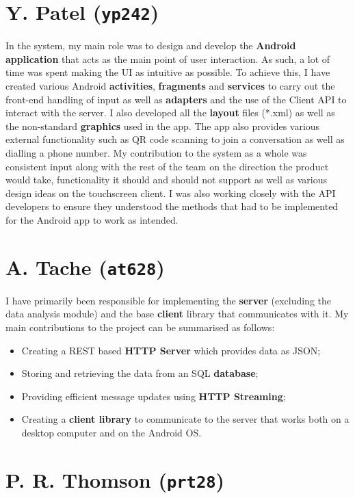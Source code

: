 \documentclass[12p, a4paper, onecolumn]{report}
\begin{document}
\section{Y. Patel (\texttt{yp242})}

In the system, my main role was to design and develop the \textbf{Android application} that acts as the main point of user interaction. As such, a lot of time was spent making the UI as intuitive as possible. To achieve this, I have created various Android \textbf{activities}, \textbf{fragments} and \textbf{services} to carry out the front-end handling of input as well as \textbf{adapters} and the use of the Client API to interact with the server. I also developed all the \textbf{layout} files (*.xml) as well as the non-standard \textbf{graphics} used in the app. The app also provides various external functionality such as QR code scanning to join a conversation as well as dialling a phone number. My contribution to the system as a whole was consistent input along with the rest of the team on the direction the product would take, functionality it should and should not support as well as various design ideas on the touchscreen client. I was also working closely with the API developers to ensure they understood the methods that had to be implemented for the Android app to work as intended.

\section{A. Tache (\texttt{at628})}

I have primarily been responsible for implementing the \textbf{server} (excluding the data analysis module) and the base \textbf{client} library that communicates with it. My main contributions to the project can be summarised as follows:
\begin{itemize} 
	\item Creating a REST based \textbf{HTTP Server} which provides data as JSON;
	\item Storing and retrieving the data from an SQL \textbf{database};
	\item Providing efficient message updates using \textbf{HTTP Streaming};
	\item Creating a \textbf{client library} to communicate to the server that works both on a desktop computer and on the Android OS.
\end{itemize}

\section{P. R. Thomson (\texttt{prt28})}
\end{document}
